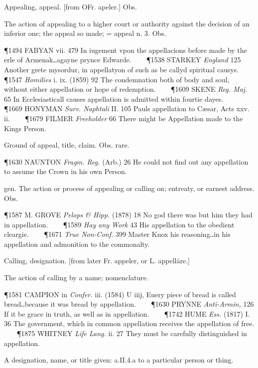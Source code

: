 \begin{description}[wide, labelwidth=!, labelindent=0pt]
\begin{myenumerate}

 Appealing, appeal. [from OFr. apeler.] Obs.

 The action of appealing to a higher court or authority against the decision of an inferior one; the appeal so made; = appeal n. 3. Obs.

\P 1494 FABYAN  vii. 479 In iugement vpon the appellacions before made by the erle of Armenak‥agayne prynce Edwarde.    
\P 1538 STARKEY  \textit{England} 125 Another grete mysordur, in appellatyon of such as be callyd spiritual causys.    
\P 1547 \textit{Homilies}  i. ix. (1859) 92 The condemnation both of body and soul, without either appellation or hope of redemption.    
\P 1609 SKENE  \textit{Reg. Maj.} 65 In Ecclesiasticall causes appellation is admitted within fourtie dayes.    
\P 1669 HONYMAN  \textit{Surv. Naphtali} II. 105 Pauls appellation to Cæsar, Acts xxv. ii.    
\P 1679 FILMER  \textit{Freeholder} 66 There might be Appellation made to the Kings Person.

 Ground of appeal, title, claim. Obs. rare.

\P 1630 NAUNTON  \textit{Fragm. Reg.} (Arb.) 26 He could not find out any appellation to assume the Crown in his own Person.

 gen. The action or process of appealing or calling on; entreaty, or earnest address. Obs.

\P 1587 M. GROVE  \textit{Pelops \& Hipp.} (1878) 18 No god there was but him they had in appellation.    
\P 1589 \textit{Hay any Work} 43 His appellation to the obedient cleargie.    
\P 1671 \textit{True  Non-Conf.} 399 Master Knox his reasoning‥in his appellation and admonition to the commonalty.

 Calling, designation. [from later Fr. appeler, or L. appellāre.]

 The action of calling by a name; nomenclature.

\P 1581 CAMPION in \textit{Confer.} iii. (1584) U iiij, Euery piece of bread is called bread‥because it was bread by appellation.    
\P 1630 PRYNNE  \textit{Anti-Armin,} 126 If it be grace in truth, as well as in appellation.    
\P 1742 HUME  \textit{Ess.} (1817) I. 36 The government, which in common appellation receives the appellation of free.    
\P 1875 WHITNEY  \textit{Life Lang.} ii. 27 They must be carefully distinguished in appellation.

 A designation, name, or title given: a.II.4.a to a particular person or thing.


\end{myenumerate}
\end{description}
